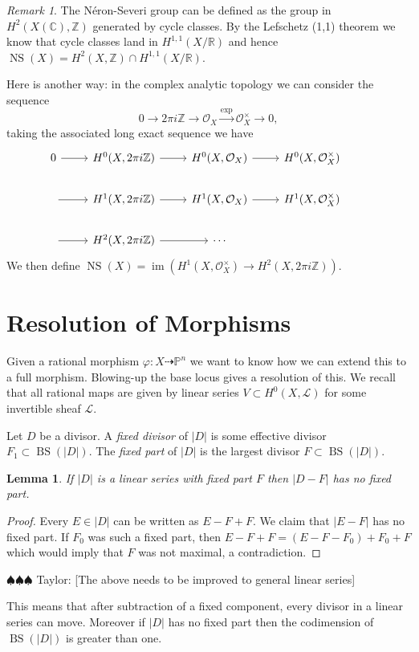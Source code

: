 \documentclass[12pt]{article}
\numberwithin{equation}{section}
\newtheorem{lemma}[theorem]{Lemma}
\theoremstyle{definition}
\theoremstyle{remark}
\newtheorem{remark}[theorem]{Remark}
\newcommand{\RR}{\mathbb{R}}
\newcommand{\CC}{\mathbb{C}}
\newcommand{\ZZ}{\mathbb{Z}}
\newcommand{\Ocal}{\mathcal{O}}
\newcommand{\PP}{\mathbb{P}}
\newcommand{\Lcal}{\mathcal{L}}
\newcommand{\im}{\operatorname{im}}
\newcommand{\BS}{\operatorname{BS}}
\newcommand{\NS}{\operatorname{NS}}
\newcommand{\taylor}[1]{{\color{blue} \sf $\spadesuit\spadesuit\spadesuit$ Taylor: [#1]}}
\begin{document}
\begin{remark}
	The N\'eron-Severi group can be defined as the group in $H^2(X(\CC),\ZZ)$ generated by cycle classes. 
	By the Lefschetz (1,1) theorem we know that cycle classes land in $H^{1,1}(X/\RR)$ and hence $\NS(X) = H^2(X,\ZZ)\cap H^{1,1}(X/\RR)$.
	
	Here is another way: in the complex analytic topology we can consider the sequence 
	$$0 \to 2\pi i \ZZ \to \Ocal_X \xrightarrow{\exp} \Ocal_X^{\times} \to 0, $$
	taking the associated long exact sequence we have 
	$$\begin{tikzcd}
	0\ar[r] & H^0(X,2\pi i \ZZ) \ar[r] & H^0(X,\Ocal_X) \ar[r] & H^0(X,\Ocal_X^{\times}) &  \\
	\ar[r] &H^1(X,2\pi i \ZZ) \ar[r] & H^1(X,\Ocal_X) \ar[r] & H^1(X,\Ocal_X^{\times}) & \\
	\ar[r] & H^2(X,2\pi i \ZZ) \ar[r] & \cdots & &
	\end{tikzcd}$$
	We then define $\NS(X) = \im( H^1(X,\Ocal_X^{\times}) \to H^2(X,2\pi i \ZZ) )$.
\end{remark}


\section{Resolution of Morphisms}
Given a rational morphism $ \varphi: X \dashrightarrow \PP^n $
we want to know how we can extend this to a full morphism. 
Blowing-up the base locus gives a resolution of this.
We recall that all rational maps are given by linear series $V \subset H^0(X,\Lcal)$ for some invertible sheaf $\Lcal$. 

Let $D$ be a divisor. 
A \emph{fixed divisor} of $\vert D \vert$ is some effective divisor $F_1 \subset \BS(\vert D\vert)$.
The \emph{fixed part} of $\vert D \vert$ is the largest divisor $F \subset \BS(\vert D \vert)$. 

\begin{lemma}
	If $\vert D \vert$ is a linear series with fixed part $F$ then $\vert D-F\vert$ has no fixed part. 
\end{lemma}
\begin{proof}
	Every $E \in \vert D \vert$ can be written as $E-F + F$. 
	We claim that $\vert E-F\vert$ has no fixed part. 
	If $F_0$ was such a fixed part, then $E-F+F=(E-F-F_0)+F_0+F$ which would imply that $F$ was not maximal, a contradiction.
\end{proof}
\taylor{The above needs to be improved to general linear series}

This means that after subtraction of a fixed component, every divisor in a linear series can move.
Moreover if $\vert D\vert$ has no fixed part then the codimension of $\BS(\vert D \vert)$ is greater than one.
\end{document}
